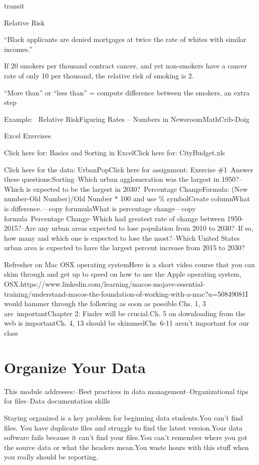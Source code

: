 \documentclass[]{book}
\begin{document}
transit

Relative Risk

``Black applicants are denied mortgages at twice the rate of whites with similar incomes.''

If 20 smokers per thousand contract cancer, and yet non-smokers have a cancer rate of only 10 per thousand, the relative risk of smoking is 2.

``More than'' or ``less than'' = compute difference between the smokers, an extra step

Example: ~Relative RiskFiguring Rates -- Numbers in NewsroomMathCrib-Doig

Excel Exercises

Click here for: Basics and Sorting in ExcelClick here for: CityBudget.xls

Click here for the data: UrbanPopClick here for assignment: Exercise \#1~Answer these questions:Sorting--Which urban agglomeration was the largest in 1950?--Which is expected to be the largest in 2030?~Percentage ChangeFormula: (New number-Old Number)/Old Number * 100 and use \% symbolCreate columnWhat is difference.---copy forumulaWhat is percentage change---copy formula~Percentage Change--Which had greatest rate of change between 1950-2015?--Are any urban areas expected to lose population from 2010 to 2030?--If so, how many and which one is expected to lose the most?--Which United States urban area is expected to have the largest percent increase from 2015 to 2030?

Refresher on Mac OSX operating systemHere is a short video course that you can skim through and get up to speed on how to use the Apple operating system, OSX.https://www.linkedin.com/learning/macos-mojave-essential-training/understand-macos-the-foundation-of-working-with-a-mac?u=50849081I would hammer through the following as soon as possible.Chs. 1, 3 are~importantChapter 2: Finder will be crucial.Ch. 5 on downloading from the web is importantCh. 4, 13 should be skimmedChs~6-11 aren't important for our class

\hypertarget{organize-your-data}{%
\chapter{Organize Your Data}\label{organize-your-data}}

This module addresses:--Best practices in data management--Organizational tips for files--Data documentation skills

Staying organized is a key problem for beginning data students.You can't find files. You have duplicate files and struggle to find the latest version.Your data software fails because it can't find your files.You can't remember where you got the source data or what the headers mean.You waste hours with this stuff when you really should be reporting.
\end{document}
